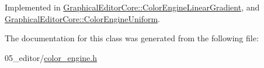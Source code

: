 Implemented in \hyperlink{classGraphicalEditorCore_1_1ColorEngineLinearGradient_acecdc769c65b3ede786edd1a6abe72b5}{Graphical\+Editor\+Core\+::\+Color\+Engine\+Linear\+Gradient}, and \hyperlink{classGraphicalEditorCore_1_1ColorEngineUniform_a91461ce9955811e4e5e2f74cd2e9ec94}{Graphical\+Editor\+Core\+::\+Color\+Engine\+Uniform}.



The documentation for this class was generated from the following file\+:\begin{DoxyCompactItemize}
\item 
05\+\_\+editor/\hyperlink{color__engine_8h}{color\+\_\+engine.\+h}\end{DoxyCompactItemize}
